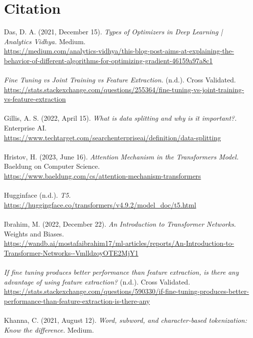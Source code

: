 \documentclass{article}
\begin{document}
\section{Citation}
Das, D. A. (2021, December 15). \textit{Types of Optimizers in Deep Learning | Analytics Vidhya.} Medium. 
\\
\url{https://medium.com/analytics-vidhya/this-blog-post-aims-at-explaining-the-behavior-of-different-algorithms-for-optimizing-gradient-46159a97a8c1}
\\\\
\textit{Fine Tuning vs Joint Training vs Feature Extraction.} (n.d.). Cross Validated.
\\
\url{https://stats.stackexchange.com/questions/255364/fine-tuning-vs-joint-training-vs-feature-extraction}
\\\\
Gillis, A. S. (2022, April 15). \textit{What is data splitting and why is it important?.} Enterprise AI.
\\
\url{https://www.techtarget.com/searchenterpriseai/definition/data-splitting}
\\\\
Hristov, H. (2023, June 16). \textit{Attention Mechanism in the Transformers Model.} Baeldung on Computer Science.
\\
\url{https://www.baeldung.com/cs/attention-mechanism-transformers}
\\\\
Hugginface (n.d.). \textit{T5.} 
\\
\url{https://huggingface.co/transformers/v4.9.2/model_doc/t5.html}
\\\\
Ibrahim, M. (2022, December 22). \textit{An Introduction to Transformer Networks.} Weights and Biases.
\\
\url{https://wandb.ai/mostafaibrahim17/ml-articles/reports/An-Introduction-to-Transformer-Networks--VmlldzoyOTE2MjY1}
\\\\
\textit{If fine tuning produces better performance than feature extraction, is there any    advantage of using feature extraction?} (n.d.). Cross Validated.
\\
\url{https://stats.stackexchange.com/questions/590330/if-fine-tuning-produces-better-performance-than-feature-extraction-is-there-any}
\\\\
Khanna, C. (2021, August 12). \textit{Word, subword, and character-based tokenization: Know the difference.} Medium.
\end{document}
